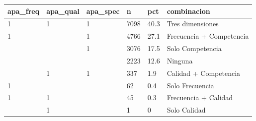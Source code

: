 \begin{tabular}{llllll}
  \toprule
apa\_freq & apa\_qual & apa\_spec & n & pct & combinacion \\ 
  \midrule
1 & 1 & 1 & 7098 & 40.3 & Tres dimensiones \\ 
  1 &  & 1 & 4766 & 27.1 & Frecuencia + Competencia \\ 
   &  & 1 & 3076 & 17.5 & Solo Competencia \\ 
   &  &  & 2223 & 12.6 & Ninguna \\ 
   & 1 & 1 & 337 & 1.9 & Calidad + Competencia \\ 
  1 &  &  & 62 & 0.4 & Solo Frecuencia \\ 
  1 & 1 &  & 45 & 0.3 & Frecuencia + Calidad \\ 
   & 1 &  & 1 & 0 & Solo Calidad \\ 
   \bottomrule
\end{tabular}
